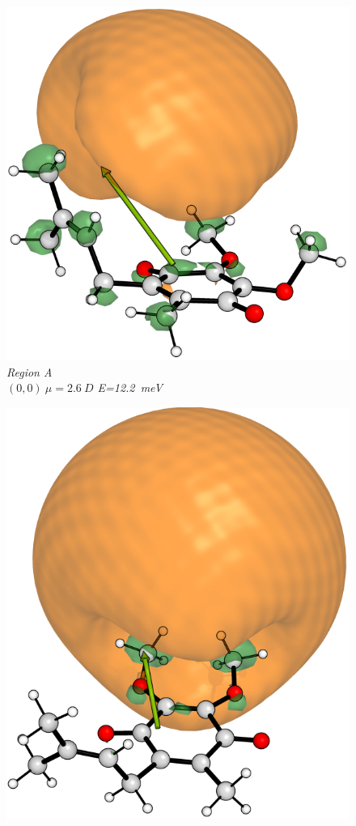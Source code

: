 \begin{figure}[h]
  \centering
    \begin{minipage}[b]{0.30\textwidth}
    \centering
      \includegraphics[width=1.2\textwidth]{chapters/results/image/Q1_249.png}
      \small\emph{Region A \\$(0,0)~\mu=2.6~D$ E=12.2~meV}
  \end{minipage}
  \hfill
  \begin{minipage}[b]{0.30\textwidth}
    \centering
      \includegraphics[width=\textwidth]{chapters/results/image/Q1_199.png}

\end{minipage}
\end{figure}
